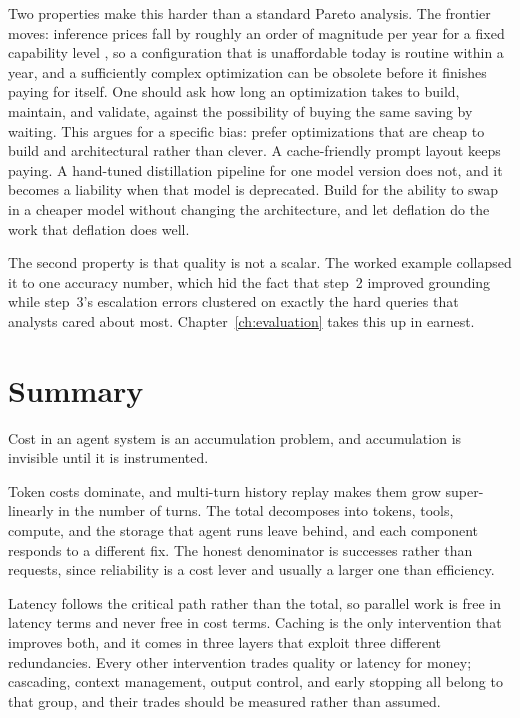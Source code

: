 \documentclass[11pt]{book}
\begin{document}
Two properties make this harder than a standard Pareto analysis. The frontier moves: inference prices fall by roughly an order of magnitude per year for a fixed capability level \cite{llmflation2024, epochpricing2025}, so a configuration that is unaffordable today is routine within a year, and a sufficiently complex optimization can be obsolete before it finishes paying for itself. One should ask how long an optimization takes to build, maintain, and validate, against the possibility of buying the same saving by waiting. This argues for a specific bias: prefer optimizations that are cheap to build and architectural rather than clever. A cache-friendly prompt layout keeps paying. A hand-tuned distillation pipeline for one model version does not, and it becomes a liability when that model is deprecated. Build for the ability to swap in a cheaper model without changing the architecture, and let deflation do the work that deflation does well.

The second property is that quality is not a scalar. The worked example collapsed it to one accuracy number, which hid the fact that step~2 improved grounding while step~3's escalation errors clustered on exactly the hard queries that analysts cared about most. Chapter~\ref{ch:evaluation} takes this up in earnest.

\section{Summary}

Cost in an agent system is an accumulation problem, and accumulation is invisible until it is instrumented.

Token costs dominate, and multi-turn history replay makes them grow super-linearly in the number of turns. The total decomposes into tokens, tools, compute, and the storage that agent runs leave behind, and each component responds to a different fix. The honest denominator is successes rather than requests, since reliability is a cost lever and usually a larger one than efficiency.

Latency follows the critical path rather than the total, so parallel work is free in latency terms and never free in cost terms. Caching is the only intervention that improves both, and it comes in three layers that exploit three different redundancies. Every other intervention trades quality or latency for money; cascading, context management, output control, and early stopping all belong to that group, and their trades should be measured rather than assumed.
\end{document}
